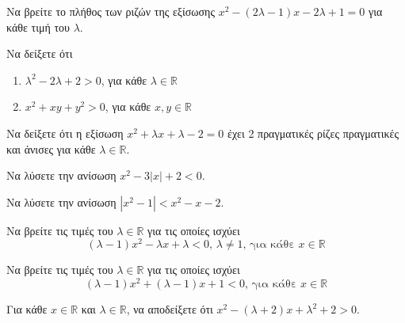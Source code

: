 \documentclass{../../presentation}
\begin{document}
\begin{askisi}
  Να βρείτε το πλήθος των ριζών της εξίσωσης $x^2-(2λ-1)x-2λ+1=0$ για κάθε τιμή του $λ$.
\end{askisi}

\begin{askisi}
  Να δείξετε ότι
  \begin{enumerate}[<+->]
    \item $λ^2-2λ+2>0$, για κάθε $λ\in\mathbb{R}$
    \item $x^2+xy+y^2>0$, για κάθε $x,y\in\mathbb{R}$
  \end{enumerate}
\end{askisi}

\begin{askisi}
  Να δείξετε ότι η εξίσωση $x^2+λx+λ-2=0$ έχει 2 πραγματικές ρίζες πραγματικές και άνισες για κάθε $λ\in\mathbb{R}$.
\end{askisi}

\begin{askisi}
  Να λύσετε την ανίσωση $x^2-3|x|+2<0$.
\end{askisi}


\begin{askisi}
  Να λύσετε την ανίσωση $|x^2-1|<x^2-x-2$.
\end{askisi}

\begin{askisi}
  Να βρείτε τις τιμές του $λ\in\mathbb{R}$ για τις οποίες ισχύει
  $$(λ-1)x^2-λx+λ<0 \text{, } λ\ne 1 \text{, για κάθε } x\in\mathbb{R}$$
\end{askisi}

\begin{askisi}
  Να βρείτε τις τιμές του $λ\in\mathbb{R}$ για τις οποίες ισχύει
  $$(λ-1)x^2+(λ-1)x+1<0 \text{, για κάθε } x\in\mathbb{R}$$
\end{askisi}

\begin{askisi}
  Για κάθε $x\in\mathbb{R}$ και $λ\in\mathbb{R}$, να αποδείξετε ότι $x^2-(λ+2)x+λ^2+2>0$.
\end{askisi}
\end{document}
